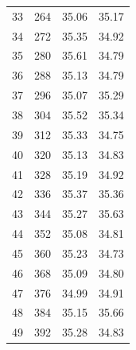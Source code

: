 \documentclass[a4paper, 11pt]{article}
\begin{document}
\begin{table}[ht]
\begin{tabular}{rrrr}
		33 & 264 & 35.06 & 35.17 \\ 
		34 & 272 & 35.35 & 34.92 \\ 
		35 & 280 & 35.61 & 34.79 \\ 
		36 & 288 & 35.13 & 34.79 \\ 
		37 & 296 & 35.07 & 35.29 \\ 
		38 & 304 & 35.52 & 35.34 \\ 
		39 & 312 & 35.33 & 34.75 \\ 
		40 & 320 & 35.13 & 34.83 \\ 
		41 & 328 & 35.19 & 34.92 \\ 
		42 & 336 & 35.37 & 35.36 \\ 
		43 & 344 & 35.27 & 35.63 \\ 
		44 & 352 & 35.08 & 34.81 \\ 
		45 & 360 & 35.23 & 34.73 \\ 
		46 & 368 & 35.09 & 34.80 \\ 
		47 & 376 & 34.99 & 34.91 \\ 
		48 & 384 & 35.15 & 35.66 \\ 
		49 & 392 & 35.28 & 34.83 \\ 
		\hline
	\end{tabular}
\end{table}
\end{document}
